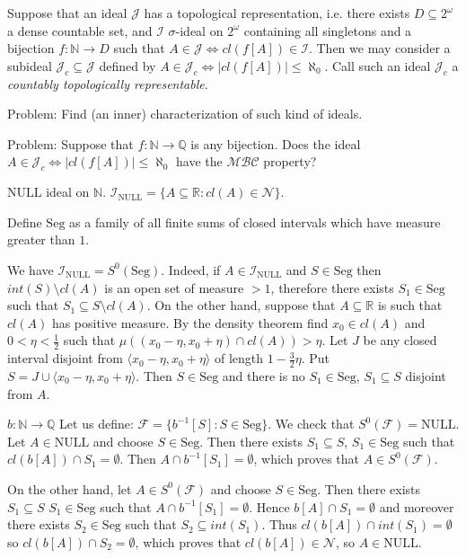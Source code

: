 \documentclass{amsart}
\theoremstyle{definition}
\theoremstyle{definition}
\newcommand{\N}{{\mathbb N}}
\newcommand{\R}{{\mathbb R}}
\newcommand{\Q}{{\mathbb Q}}
\newcommand{\I}{\mathcal I}
\newcommand{\J}{\mathcal J}
\newcommand{\calF}{\mathcal{F}}
\newcommand{\calI}{\mathcal{I}}
\newcommand{\Seg}{\mathrm{Seg}}
\newcommand{\NULL}{\mathrm{NULL}}
\newcommand{\INULL}{\calI_\mathrm{NULL}}
\newcommand{\cl}{\mathit{cl}}
\newcommand{\interior}{\mathit{int}}
\newcommand{\negligible}{\mathcal{N}}
\begin{document}
Suppose that an ideal $\mathcal{J}$ has a topological representation, i.e.
there exists $D\subseteq 2^{\omega}$ a dense countable set, and $\I$ 
$\sigma$-ideal on $2^{\omega}$ containing all singletons 
and a bijection $f\colon \N\to D$ such that 
$A\in\J \iff \mathit{cl}(f[A])\in\mathcal{I}$. 
Then we may consider a subideal $\J_c \subseteq \J$ defined by
$A\in\J_c \iff |\mathit{cl}(f[A])| \leq \aleph_0$.
Call such an ideal $\J_c$ a \emph{countably topologically representable}.

Problem: Find (an inner) characterization of such kind of ideals.

Problem: Suppose that $f\colon \N\to \Q$ is any bijection.
Does the ideal $A\in\J_c \iff |\mathit{cl}(f[A])| \leq \aleph_0$
have the $\mathcal{MBC}$ property?

    \color{cyan}
$\NULL$ ideal on $\N$.
$\INULL = \{A \subseteq\R\colon \cl(A) \in \negligible \}$.

Define $\Seg$ as a family of all finite sums of closed intervals
which have measure greater than $1$.

We have $\INULL = S^0(\Seg)$. Indeed, if $A \in \INULL$
and $S\in\Seg$ then $\mathit{int}(S) \setminus \cl(A)$ is an open 
set of measure $> 1$, therefore there exists $S_1\in \Seg$
such that $S_1 \subseteq S \setminus \cl(A)$.
  On the other hand, suppose that $A\subseteq \R$
is such that $\cl(A)$ has positive measure. By the
density theorem find $x_0 \in \cl(A)$ and 
$0 < \eta < \frac{1}{2}$ such that
$\mu((x_0-\eta, x_0+\eta) \cap \cl(A)) > \eta$.
Let $J$ be any closed interval disjoint from 
$\langle x_0-\eta, x_0+\eta\rangle$ of length
$1 - \frac{3}{2}\eta$. 
Put $S = J \cup \langle x_0-\eta, x_0+\eta\rangle$.
Then $S\in\Seg$ and there is no $S_1\in\Seg$, $S_1 \subseteq S$
disjoint from $A$.

$b\colon \N\to \Q$
Let us define:
	$\calF = \{b^{-1}[S]\colon S \in \Seg\}$.
We check that 	
$S^0(\calF) = \NULL$.
Let $A\in \NULL$ and choose $S \in \Seg$.
Then there exists $S_1\subseteq S$, $S_1\in \Seg$
such that $\cl(b[A]) \cap S_1 = \emptyset$.
Then $A \cap b^{-1}[S_1] = \emptyset$, which
proves that $A\in S^0(\calF)$.

On the other hand, let $A\in S^0(\calF)$ and
choose $S\in\Seg$. Then there exists $S_1 \subseteq S$
$S_1\in\Seg$ such that $A\cap b^{-1}[S_1] = \emptyset$.
Hence $b[A] \cap S_1 = \emptyset$ and moreover there
exists $S_2\in\Seg$ such that $S_2 \subseteq \interior(S_1)$.
Thus $\cl(b[A])\cap \interior(S_1) = \emptyset$
so $\cl(b[A])\cap S_2 = \emptyset$, which
proves that $\cl(b[A])\in\negligible$, so $A\in\NULL$.
\end{document}
